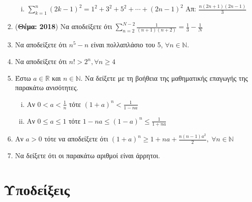 \begin{enumerate}
\begin{enumerate}[i)]
        \item $ \sum_{k=1}^{n} (2k-1)^{2} = 1^{2} + 3^{2} + 5^{2} + \cdots 
          + (2n-1)^{2}  $ \hfill Απ: $ \frac{n(2n+1)(2n-1)}{3} $ 
      \end{enumerate}

    \item \label{ask:thema18sum} ({\bfseries Θέμα: 2018}) Να αποδείξετε ότι 
      $ \sum_{n=2}^{N-2} \frac{1}{(n+1)(n+2)} = \frac{1}{3} - \frac{1}{N} $

    \item Να αποδείξετε ότι $ n^{5} - n $ είναι πολλαπλάσιο του 5,
      $ \forall n \in \mathbb{N} $.

    \item Να αποδείξετε ότι $ n! > 2^{n}, \forall n \geq 4 $

    \item Έστω $ a \in \mathbb{R} $ και $ n \in \mathbb{N} $. Να δείξετε
      με τη βοήθεια της μαθηματικής επαγωγής της παρακάτω ανισότητες.
      \begin{enumerate}[i)]
        \item Αν $ 0<a< \frac{1}{n} $ τότε $ (1+a)^{n} < \frac{1}{1-na} $
        \item Αν $ 0 \leq a \leq 1$  τότε $ 1-na \leq (1-a)^{n} \leq
          \frac{1}{1+na} $
      \end{enumerate}

    \item Αν $a > 0$ τότε να αποδείξετε ότι $ (1+a)^{n} \geq 1 + na + 
      \frac{n(n-1)a^{2}}{2},\; \forall n \in \mathbb{N}   $ 

    \item Να δείξετε ότι οι παρακάτω αριθμοί είναι άρρητοι.
  \end{enumerate}

  \vspace{\baselineskip}

  \section*{Υποδείξεις} 

